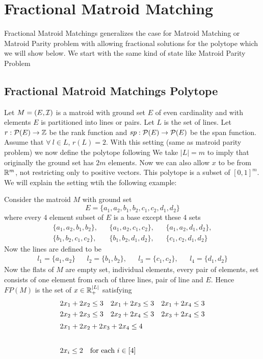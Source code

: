 \chapter{Fractional Matroid Matching}
Fractional Matroid Matchings generalizes the case for Matroid Matching or Matroid Parity problem with allowing fractional solutions for the polytope which we will show below. We start with the same kind of state like Matroid Parity Problem
\section{Fractional Matroid Matchings Polytope}
Let $M=(E,\mathcal{I})$ is a matroid  with ground set $E$ of even cardinality and with elements $E$ is partitioned  into lines or pairs. Let $L$ is the  set of lines.  Let $r:\mathcal{P}(E)\to \mathbb{Z}$ be the rank function and $sp:\mathcal{P}(E)\to \mathcal{P}(E)$ be the span function. Assume that $\forall\ l\in L$, $r(L)=2$. With this setting (same as matroid parity problem) we now define the polytope following \cite{fraclinmat}
We take $|L|=m$ to imply that originally the ground set has $2m$ elements. Now we can also allow $x$ to be from $\mathbb{R}^{m}$, not restricting only to positive vectors. This polytope is a subset of $[0,1]^m$. We will explain the setting wtih the following example:
\begin{example}{}{}
	Consider the matroid $M$ with ground set $$E=\{a_1,a_2,b_1,b_2,c_1,c_2,d_1,d_2\}$$where every 4 element subset of $E$ is a base except these 4 sets \begin{align*}
		\{a_1,a_2,b_1,b_2\}, && \{a_1,a_2,c_1,c_2\}, && \{a_1,a_2,d_1,d_2\},\\
		\{b_1,b_2,c_1,c_2\}, && \{b_1,b_2,d_1,d_2\}, && \{c_1,c_2,d_1,d_2\}
	\end{align*}Now the lines are  defined to be \begin{align*}
	l_1=\{a_1,a_2\} && l_2=\{b_1,b_2\}, && l_3=\{c_1,c_2\}, && l_4=\{d_1,d_2\}
	\end{align*} Now the flats of $M$ are empty set, individual elements, every pair of elements, set consists of one element from each of three lines, pair of line and $E$. Hence $FP(M)$ is the set of $x\in\mathbb{R}^{|L|}_+$ satisfying \begin{align*}
	2x_1+2x_2\leq 3 && 2x_1+2x_3\leq 3 && 2x_1+2x_4\leq 3\\
	2x_2+2x_3\leq 3 && 2x_2+2x_4\leq 3 && 2x_3+2x_4\leq 3\\
	\shortintertext{\centering $2x_1+2x_2+2x_3+2x_4\leq 4$} \\
	\shortintertext{\centering $2x_i\leq 2\quad \text{for each $i\in[4]$}$}
	\end{align*}
\end{example}
